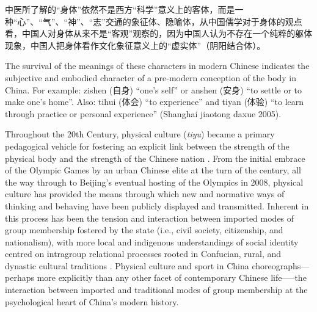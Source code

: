     中医所了解的``身体''依然不是西方``科学''意义上的客体，而是一种``心''、``气''、``神''、``志''交通的象征体、隐喻体，从中国儒学对于身体的观点看，中国人对身体从来不是``客观''观察的，因为中国人认为不存在一个纯粹的躯体现象，中国人把身体看作文化象征意义上的``虚实体''（阴阳结合体）。

            The survival of the meanings of these characters in modern Chinese indicates the subjective and embodied character of a pre-modern conception of the body in China. For example: zishen (自身) ``one’s self'' or anshen (安身) ``to settle or to make one’s home''.  Also: tihui (体会) ``to experience'' and tiyan (体验) ``to learn through practice or personal experience'' (Shanghai jiaotong daxue 2005).


Throughout the 20th Century, physical culture (\textit{tiyu}) became a primary pedagogical vehicle for fostering an explicit link between the strength of the physical body and the strength of the Chinese nation \cites[32]{Morris2004}[49]{Brownell1995}.  From the initial embrace of the Olympic Games by an urban Chinese elite at the turn of the century, all the way through to Beijing's eventual hosting of the Olympics in 2008, physical culture has provided the means through which new and normative ways of thinking and behaving have been publicly displayed and transmitted.  Inherent in this process has been the tension and interaction between imported modes of group membership fostered by the state (i.e., civil society, citizenship, and nationalism), with more local and indigenous understandings of social identity centred on intragroup relational processes rooted in Confucian, rural, and dynastic cultural traditions \citep{Fei1992}.  Physical culture and sport in China choreographs---perhaps more explicitly than any other facet of contemporary Chinese life—--the interaction between imported and traditional modes of group membership at the psychological heart of China's modern history.

